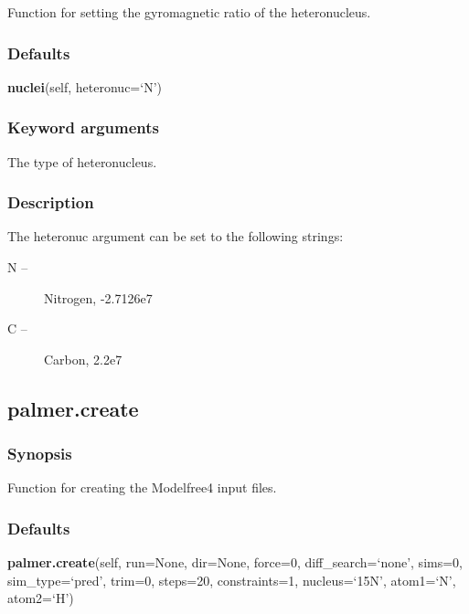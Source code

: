  Function for setting the gyromagnetic ratio of the heteronucleus. 
  

  
 \subsubsection{Defaults} 

 \textsf{\textbf{nuclei}(self, heteronuc=`N')} 

  
 \subsubsection{Keyword arguments} 

   The type of heteronucleus.  

  

  
 \subsubsection{Description} 

 The heteronuc argument can be set to the following strings: 
  

 \begin{description} 
 \item[N --]  Nitrogen, -2.7126e7  
 \item[C --]  Carbon, 2.2e7  
 \end{description} 
  

  

 \newpage 

 \subsection{palmer.create} 

  
 \subsubsection{Synopsis} 

 Function for creating the Modelfree4 input files. 
  

  
 \subsubsection{Defaults} 

 \textsf{\textbf{palmer.create}(self, run=None, dir=None, force=0, diff\_search=`none', sims=0, sim\_type=`pred', trim=0, steps=20, constraints=1, nucleus=`15N', atom1=`N', atom2=`H')} 

